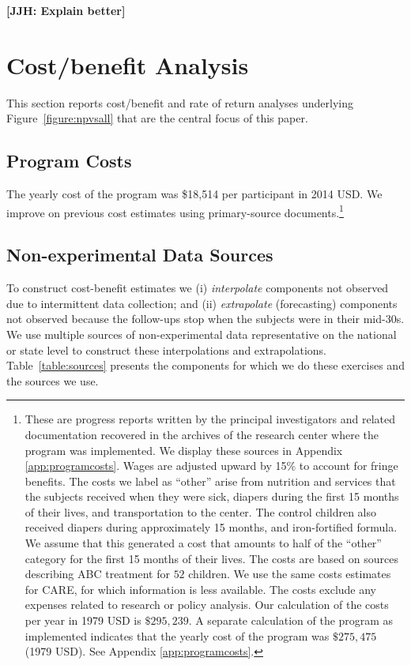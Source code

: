 \textbf{[JJH: Explain better]}

\section{Cost/benefit Analysis} \label{section:cbaresults}

This section reports cost/benefit and rate of return analyses underlying Figure~\ref{figure:npvsall} that are the central focus of this paper.

\subsection{Program Costs} \label{section:programscosts}

The yearly cost of the program was \$18,514 per participant in 2014 USD. We improve on previous cost estimates using primary-source documents.\footnote{These are progress reports written by the principal investigators and related documentation recovered in the archives of the research center where the program was implemented. We display these sources in Appendix \ref{app:programcosts}. Wages are adjusted upward by 15\% to account for fringe benefits. The costs we label as ``other'' arise from nutrition and services that the subjects received when they were sick, diapers during the first 15 months of their lives, and transportation to the center. The control children also received diapers during approximately 15 months, and iron-fortified formula. We assume that this generated a cost that amounts to half of the ``other'' category for the first 15 months of their lives. The costs are based on sources describing ABC treatment for $52$ children. We use the same costs estimates for CARE, for which information is less available. The costs exclude any expenses related to research or policy analysis. Our calculation of the costs per year in 1979 USD is $\$295,239$. A separate calculation of the program as implemented indicates that the yearly cost of the program was $\$275,475$ (1979 USD). See Appendix \ref{app:programcosts}.}

\subsection{Non-experimental Data Sources}

To construct cost-benefit estimates we (i) \textit{interpolate} components not observed due to intermittent data collection; and (ii) \textit{extrapolate} (forecasting) components not observed because the follow-ups stop when the subjects were in their mid-30s. We use multiple sources of non-experimental data representative on the national or state level to construct these interpolations and extrapolations. Table~\ref{table:sources} presents the components for which we do these exercises and the sources we use.

